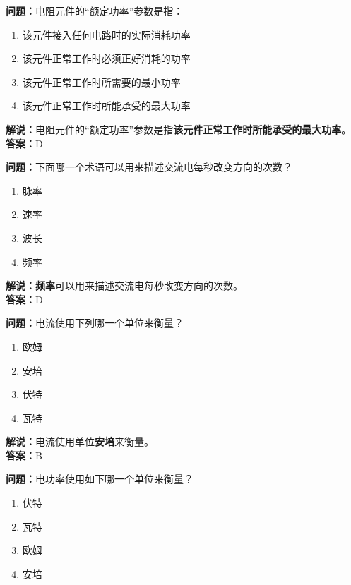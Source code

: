 \documentclass{ctexbook}
\begin{document}
\bigskip


\noindent\textbf{问题：}电阻元件的“额定功率”参数是指：

\begin{enumerate}[label=\Alph*), leftmargin=3em]
	\item 该元件接入任何电路时的实际消耗功率
	\item 该元件正常工作时必须正好消耗的功率
	\item 该元件正常工作时所需要的最小功率
	\item 该元件正常工作时所能承受的最大功率
\end{enumerate}

\noindent\textbf{解说：}电阻元件的“额定功率”参数是指\textbf{该元件正常工作时所能承受的最大功率}。\\\noindent\textbf{答案：}D



\bigskip


\noindent\textbf{问题：}下面哪一个术语可以用来描述交流电每秒改变方向的次数？

\begin{enumerate}[label=\Alph*), leftmargin=3em]
	\item 脉率
	\item 速率
	\item 波长
	\item 频率
\end{enumerate}

\noindent\textbf{解说：}\textbf{频率}可以用来描述交流电每秒改变方向的次数。\\\noindent\textbf{答案：}D



\bigskip


\noindent\textbf{问题：}电流使用下列哪一个单位来衡量？

\begin{enumerate}[label=\Alph*), leftmargin=3em]
	\item 欧姆
	\item 安培
	\item 伏特
	\item 瓦特
\end{enumerate}

\noindent\textbf{解说：}电流使用单位\textbf{安培}来衡量。\\\noindent\textbf{答案：}B


\bigskip


\noindent\textbf{问题：}电功率使用如下哪一个单位来衡量？

\begin{enumerate}[label=\Alph*), leftmargin=3em]
	\item 伏特
	\item 瓦特
	\item 欧姆
	\item 安培
\end{enumerate}
\end{document}
